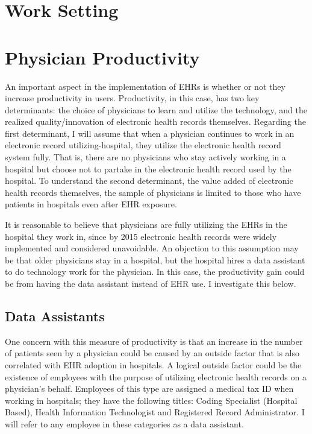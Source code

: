 \documentclass[11pt]{article}
\begin{document}
\section{Work Setting}

\section{Physician Productivity}

An important aspect in the implementation of EHRs is whether or not they increase productivity in users. Productivity, in this case, has two key determinants: the choice of physicians to learn and utilize the technology, and the realized quality/innovation of electronic health records themselves. Regarding the first determinant, I will assume that when a physician continues to work in an electronic record utilizing-hospital, they utilize the electronic health record system fully. That is, there are no physicians who stay actively working in a hospital but choose not to partake in the electronic health record used by the hospital. To understand the second determinant, the value added of electronic health records themselves, the sample of physicians is limited to those who have patients in hospitals even after EHR exposure. 

It is reasonable to believe that physicians are fully utilizing the EHRs in the hospital they work in, since by 2015 electronic health records were widely implemented and considered unavoidable. An objection to this assumption may be that older physicians stay in a hospital, but the hospital hires a data assistant to do technology work for the physician. In this case, the productivity gain could be from having the data assistant instead of EHR use. I investigate this below.

\subsection{Data Assistants}

One concern with this measure of productivity is that an increase in the number of patients seen by a physician could be caused by an outside factor that is also correlated with EHR adoption in hospitals. A logical outside factor could be the existence of employees with the purpose of utilizing electronic health records on a physician's behalf. Employees of this type are assigned a medical tax ID when working in hospitals; they have the following titles: Coding Specialist (Hospital Based), Health Information Technologist and Registered Record Administrator. I will refer to any employee in these categories as a data assistant. 
\end{document}
